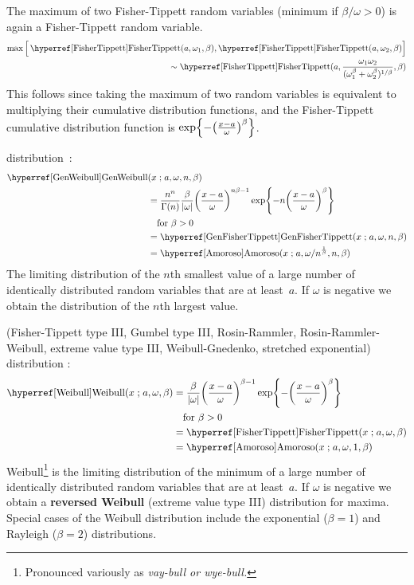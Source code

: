 The maximum of two Fisher-Tippett random variables (minimum if $\beta/\omega>0$)  is again a Fisher-Tippett random variable. 
\begin{align*}
\max\Big[ \opr{FisherTippett}(a,\omega_1,\beta),  \opr{FisherTippett}(a, \omega_2,\beta)  \Big]&\\  \sim 
 \opr{FisherTippett}(a, \frac{\omega_1 \omega_2}{(\omega_1^{\beta} + \omega_2^{\beta} )^{1/\beta}},\beta) \checked
\end{align*}
This follows since taking the maximum of two random variables is equivalent to multiplying their cumulative distribution functions, and the Fisher-Tippett cumulative distribution function is $\exp \Left\{
-  \Left(\frac{x-a}{\omega}\Right)^{\beta}
\Right\}$.



 distribution~\cite{Smirnov1949,Barndorff-Nielsen1963}:
\begin{align}
\label{GenWeibull}
\opr{GenWeibull}&(x \given a , \omega, n, \beta) 
\\ \notag &=	\frac{n^n}{\Gamma(n)}  \frac{ \beta}{| \omega |} \Left(\frac{x-a }{\omega}\Right)^{n \beta-1} \exp\Left\{-n \Left(\frac{x-a }{\omega}\Right)^{ \beta}\Right\} 
\\ \notag &\quad \text{for } \beta>0 
\\ \notag & = \opr{GenFisherTippett}(x\given a, \omega, n, \beta) \checked
\\ \notag
&= \opr{Amoroso}(x\given  a , {\omega}/{n^{\frac{1}{\beta} }}, n, \beta)  \checked
\end{align}
The limiting distribution of the $n$th smallest value of a large number of  identically distributed random variables that are at least~$a$. 
If $\omega$ is negative we obtain the distribution of the $n$th largest value.




(Fisher-Tippett type III, Gumbel type III, Rosin-Rammler, Rosin-Rammler-Weibull, extreme value type III, Weibull-Gnedenko, stretched exponential) distribution \cite{Weibull1951,Johnson1995}: 
\begin{align}
\label{Weibull}
\opr{Weibull}(x \given a ,\omega, \beta) 
&=	\frac{\beta}{| \omega |} \Left(\frac{x-a }{\omega}\Right)^{\beta-1} \exp\Left\{-\Left(\frac{x-a }{\omega}\Right)^{\beta}\Right\}  \checked
\\ \notag &\quad \text{for } \beta>0 
\\ \notag
& = \opr{FisherTippett}(x\given  a, \omega, \beta) \checked
\\ \notag
&= \opr{Amoroso}(x\given  a , \omega, 1, \beta)  \checked
\end{align}
Weibull\footnote{Pronounced variously as \sl{vay-bull} or \sl{wye-bull}.} is the limiting distribution of the minimum of a large number of  identically distributed random variables that are at least~$a$.  If $\omega$ is negative we obtain a {\bf reversed Weibull} (extreme value type III) distribution for maxima.
Special cases of the Weibull distribution include the exponential ($\beta=1$) and Rayleigh ($\beta=2$)  distributions.

